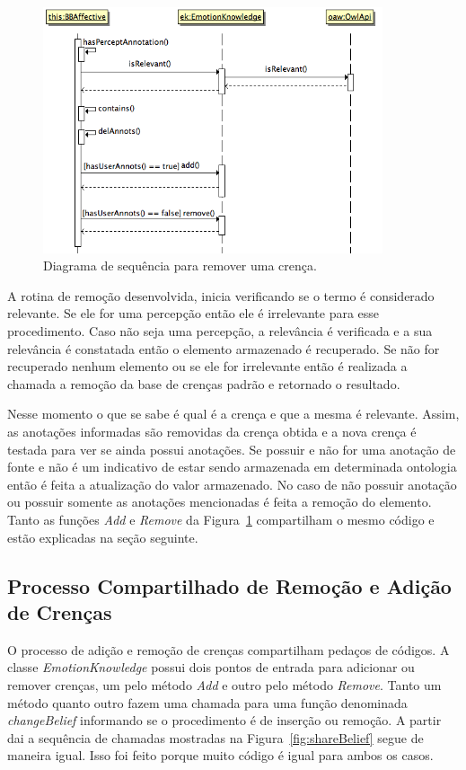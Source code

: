 \begin{figure}
  \centering
  \includegraphics[width=10cm]{figuras/delB.png}
  \caption{Diagrama de sequência para remover uma crença.}
  \label{fig:delBelief}
\end{figure}

A rotina de remoção desenvolvida, inicia verificando se o termo é
considerado relevante. Se ele for uma percepção então ele é irrelevante para
esse procedimento. Caso não seja uma percepção, a relevância é verificada e
a sua relevância é constatada então o elemento armazenado é recuperado. Se não for
recuperado nenhum elemento ou se ele for irrelevante então é realizada a
chamada a remoção da base de crenças padrão e retornado o resultado.

Nesse momento o que se sabe é qual é a crença e que a mesma é relevante.
Assim, as anotações informadas são removidas da crença obtida e a nova
crença é testada para ver se ainda possui anotações. Se possuir e não for uma
anotação de fonte e não é um indicativo de estar sendo armazenada em
determinada ontologia então é feita a atualização do valor armazenado. No caso
de não possuir anotação ou possuir somente as anotações mencionadas é feita a
remoção do elemento. Tanto as funções \emph{Add} e \emph{Remove} da
Figura~\ref{fig:delBelief} compartilham o mesmo código e estão explicadas na
seção seguinte.

\subsection{Processo Compartilhado de Remoção e Adição de Crenças}

O processo de adição e remoção de crenças compartilham pedaços de códigos. A
classe \emph{EmotionKnowledge} possui dois pontos de entrada para adicionar ou
remover crenças, um pelo método \emph{Add} e outro pelo método \emph{Remove}.
Tanto um método quanto outro fazem uma chamada para uma função denominada
\emph{changeBelief} informando se o
procedimento é de inserção ou remoção. A partir dai a sequência de chamadas
mostradas na Figura~\ref{fig:shareBelief} segue de maneira igual. Isso foi
feito porque muito código é igual para ambos os casos.

